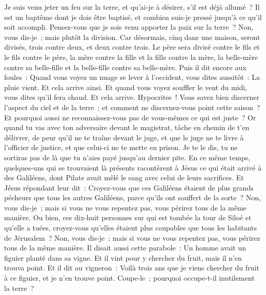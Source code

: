 \begin{multicols}{2}
Je suis venu jeter un feu sur la terre, et qu'ai-je à désirer, s'il est déjà allumé~?
Il est un baptême dont je dois être baptisé, et combien suis-je pressé jusqu'à ce qu'il soit accompli.
Pensez-vous que je sois venu apporter la paix sur la terre~? Non, vous dis-je~; mais plutôt la division.
Car désormais, cinq dans une maison, seront divisés, trois contre deux, et deux contre trois.
Le père sera divisé contre le fils et le fils contre le père, la mère contre la fille et la fille contre la mère, la belle-mère contre sa belle-fille et la belle-fille contre sa belle-mère.
Puis il dit encore aux foules~: Quand vous voyez un nuage se lever à l'occident, vous dites aussitôt~: La pluie vient. Et cela arrive ainsi.
Et quand vous voyez souffler le vent du midi, vous dites qu'il fera chaud. Et cela arrive.
Hypocrites~! Vous savez bien discerner l'aspect du ciel et de la terre~; et comment ne discernez-vous point cette saison~?
Et pourquoi aussi ne reconnaissez-vous pas de vous-mêmes ce qui est juste~?
Or quand tu vas avec ton adversaire devant le magistrat, tâche en chemin de t'en délivrer, de peur qu'il ne te traîne devant le juge, et que le juge ne te livre à l'officier de justice, et que celui-ci ne te mette en prison.
Je te le dis, tu ne sortiras pas de là que tu n'aies payé jusqu'au dernier pite.
\VerseOne{}En ce même temps, quelques-uns qui se trouvaient là présents racontèrent à Jésus ce qui était arrivé à des Galiléens, dont Pilate avait mêlé le sang avec celui de leurs sacrifices.
Et Jésus répondant leur dit~: Croyez-vous que ces Galiléens étaient de plus grands pécheurs que tous les autres Galiléens, parce qu'ils ont souffert de la sorte~?
Non, vous dis-je~; mais si vous ne vous repentez pas, vous périrez tous de la même manière.
Ou bien, ces dix-huit personnes sur qui est tombée la tour de Siloé et qu'elle a tuées, croyez-vous qu'elles étaient plus coupables que tous les habitants de Jérusalem~?
Non, vous dis-je~; mais si vous ne vous repentez pas, vous périrez tous de la même manière.
Il disait aussi cette parabole~: Un homme avait un figuier planté dans sa vigne. Et il vint pour y chercher du fruit, mais il n'en trouva point.
Et il dit au vigneron~: Voilà trois ans que je viens chercher du fruit à ce figuier, et je n'en trouve point. Coupe-le~; pourquoi occupe-t-il inutilement la terre~?

\end{multicols}
